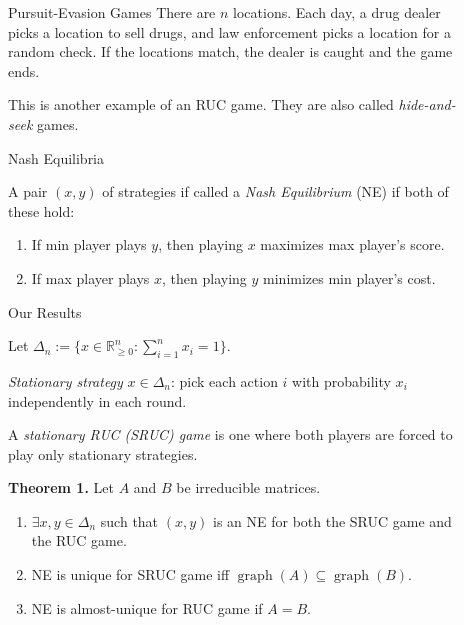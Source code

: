 \documentclass[final,20pt]{beamer}
\newlength{\sepwidth}
\newlength{\colwidth}
\newcommand{\separatorcolumn}{\begin{column}{\sepwidth}\end{column}}
\newcommand*{\defeq}{:=}
\DeclareMathOperator{\graph}{graph}
\begin{document}
\begin{frame}[t]
\begin{columns}[t]
\begin{column}{\colwidth}
\begin{block}{Pursuit-Evasion Games}
There are $n$ locations. Each day, a drug dealer picks a location to sell drugs,
and law enforcement picks a location for a random check.
If the locations match, the dealer is caught and the game ends.

This is another example of an RUC game.
They are also called \emph{hide-and-seek} games.

\end{block}

\begin{block}{Nash Equilibria}

A pair $(x, y)$ of strategies if called a \emph{Nash Equilibrium} (NE) if both of these hold:
\begin{enumerate}
\item If min player plays $y$, then playing $x$ maximizes max player's score.
\item If max player plays $x$, then playing $y$ minimizes min player's cost.
\end{enumerate}

\end{block}

\begin{alertblock}{Our Results}

Let $\Delta_n \defeq \{x \in \mathbb{R}_{\ge 0}^n: \sum_{i=1}^n x_i = 1\}$.

\emph{Stationary strategy} $x \in \Delta_n$:
pick each action $i$ with probability $x_i$ independently in each round.

A \emph{stationary RUC (SRUC) game} is one where both players are
forced to play only stationary strategies.

\textbf{Theorem 1.}
Let $A$ and $B$ be irreducible matrices.
\begin{enumerate}
\item $\exists x, y \in \Delta_n$ such that
    $(x, y)$ is an NE for both the SRUC game and the RUC game.
\item NE is unique for SRUC game iff $\graph(A) \subseteq \graph(B)$.
\item NE is almost-unique for RUC game if $A = B$.
\end{enumerate}

\end{alertblock}

\end{column}

\separatorcolumn

\begin{column}{\colwidth}


\end{column}
\end{columns}
\end{frame}
\end{document}
